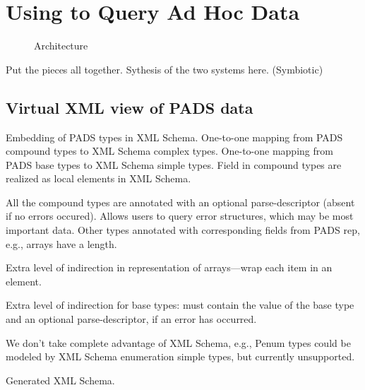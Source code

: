 \section{Using \padx{} to Query Ad Hoc Data}
\label{section:padx}

\begin{figure}
\begin{center}
\end{center}
\caption{\padx{} Architecture}
\label{figure:padx-arch}
\end{figure}

Put the pieces all together.  Sythesis of the two systems here. 
(Symbiotic)

\subsection{Virtual XML view of PADS data}

Embedding of PADS types in XML Schema.  One-to-one mapping from
PADS compound types to XML Schema complex types.  One-to-one mapping
from PADS base types to XML Schema simple types.  Field in compound
types are realized as local elements in XML Schema. 

All the compound types are annotated with an optional parse-descriptor
(absent if no errors occured).  Allows users to query error
structures, which may be most important data.  Other types annotated
with corresponding fields from PADS rep, e.g., arrays have a length. 

Extra level of indirection in representation of arrays---wrap each
item in an element. 

Extra level of indirection for base types: must contain the value of
the base type and an optional parse-descriptor, if an error has
occurred. 

We don't take complete advantage of XML Schema, e.g., Penum types
could be modeled by XML Schema enumeration simple types, but currently
unsupported.

Generated XML Schema.

